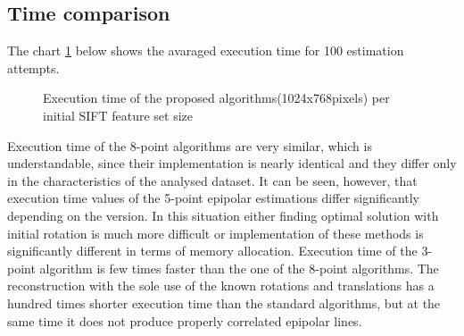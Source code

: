 \subsection{Time comparison}
The chart \ref{plot:ExecutionTime} below shows the avaraged  execution time for 100 estimation attempts.
\begin{figure}[hb!]
  \begin{center}
    \caption{Execution time of the proposed algorithms(1024x768pixels) per initial SIFT feature set size}
    \label{plot:ExecutionTime}
  \end{center}
\end{figure}
Execution time of the 8-point algorithms are very similar, which is understandable, since their implementation is nearly identical and they differ only in the characteristics of the analysed dataset. It can be seen, however, that execution time values of the 5-point epipolar estimations differ significantly depending on the version. In this situation either finding optimal solution with initial rotation is much more difficult or implementation of these methods is significantly different in terms of memory allocation. Execution time of the 3-point algorithm is few times faster than the one of the 8-point algorithms. The reconstruction with the sole use of the known rotations and translations has a hundred times shorter execution time than the standard algorithms, but at the same time it does not produce properly correlated epipolar lines.

